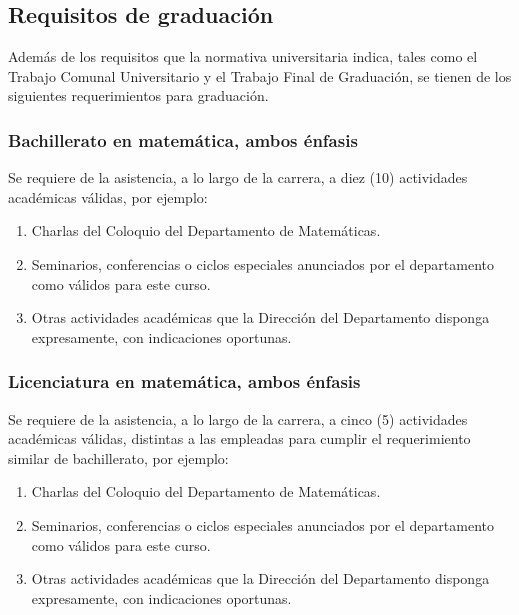 \subsection{Requisitos de graduación}

Además de los requisitos que la normativa universitaria indica, tales como el Trabajo Comunal Universitario y el Trabajo Final de Graduación, se tienen de los siguientes requerimientos para graduación.

\subsubsection{Bachillerato en matemática, ambos énfasis}

Se requiere de la asistencia, a lo largo de la carrera, a diez (10) actividades académicas válidas, por ejemplo:
\begin{enumerate}
    \item Charlas del Coloquio del Departamento de Matemáticas.
    \item Seminarios, conferencias o ciclos especiales anunciados por el departamento como válidos para este curso.
    \item Otras actividades académicas que la Dirección del Departamento disponga expresamente, con indicaciones oportunas.
\end{enumerate}

\subsubsection{Licenciatura en matemática, ambos énfasis}

Se requiere de la asistencia, a lo largo de la carrera, a cinco (5) actividades académicas válidas, distintas a las empleadas para cumplir el requerimiento similar de bachillerato, por ejemplo:
\begin{enumerate}
    \item Charlas del Coloquio del Departamento de Matemáticas.
    \item Seminarios, conferencias o ciclos especiales anunciados por el departamento como válidos para este curso.
    \item Otras actividades académicas que la Dirección del Departamento disponga expresamente, con indicaciones oportunas.
\end{enumerate}